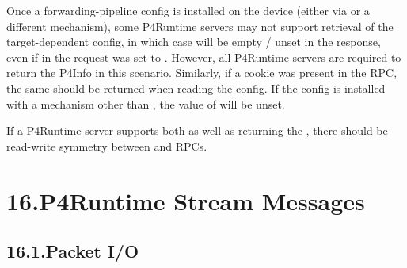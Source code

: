 \documentclass[11pt]{article}
\begin{document}
{%
Once a forwarding-pipeline config is installed on the device (either via
 or a different mechanism), some P4Runtime servers
may not support retrieval of the target-dependent config, in which case
 will be empty / unset in the response, even if
 in the request was set to . However, all P4Runtime servers
are required to return the P4Info in this scenario. Similarly, if a cookie was
present in the  RPC, the same should be returned
when reading the config. If the config is installed with a mechanism other than
, the value of  will be unset.%

If a P4Runtime server supports both  as well as
returning the , there should be read-write symmetry between
 and  RPCs.%

\section{16.\hspace*{0.5em}P4Runtime Stream Messages}\label{sec-p4runtime-stream-messages}%

\subsection{16.1.\hspace*{0.5em}Packet I/O}\label{sec-packet-i_o}%

}
\end{document}
